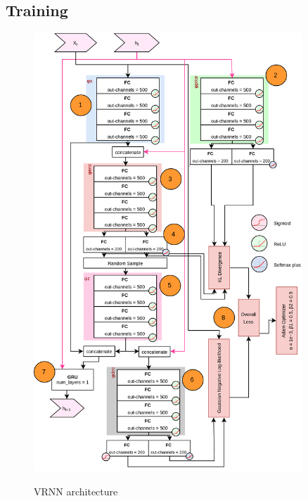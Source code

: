 \documentclass[12pt]{article}
\begin{document}
\subsection{Training}



\begin{figure}
\includegraphics[width=0.9\textwidth]{img/vrnn-arch.png}
\label{fig:vrnn-arch}
\caption{VRNN architecture} %
\end{figure}
\end{document}
